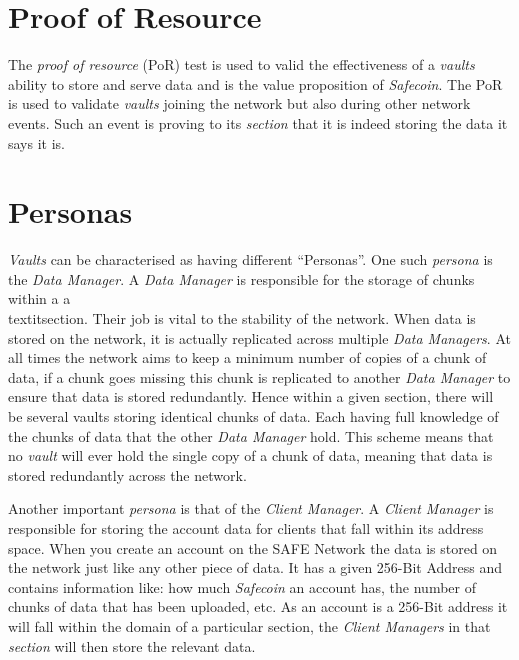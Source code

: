\section{Proof of Resource}
\label{subsec:proof-of-resource}

The \textit{proof of resource} (PoR) test is used to valid the effectiveness of a \textit{vaults} ability to store and serve data and is the value proposition of \textit{Safecoin}. The PoR is used to validate \textit{vaults} joining the network but also during other network events. Such an event is proving to its \textit{section} that it is indeed storing the data it says it is.

\section{Personas}

\textit{Vaults} can be characterised as having different ``Personas''. One such \textit{persona} is the \textit{Data Manager}. A \textit{Data Manager} is responsible for the storage of chunks within a a\\textit{section}. Their job is vital to the stability of the network. When data is stored on the network, it is actually replicated across multiple \textit{Data Managers}. At all times the network aims to keep a minimum number of copies of a chunk of data, if a chunk goes missing this chunk is replicated to another \textit{Data Manager} to ensure that data is stored redundantly. Hence within a given section, there will be several vaults storing identical chunks of data. Each having full knowledge of the chunks of data that the other \textit{Data Manager} hold. This scheme means that no \textit{vault} will ever hold the single copy of a chunk of data, meaning that data is stored redundantly across the network.

Another important \textit{persona} is that of the \textit{Client Manager}. A \textit{Client Manager} is responsible for storing the account data for clients that fall within its address space. When you create an account on the SAFE Network the data is stored on the network just like any other piece of data. It has a given 256-Bit Address and contains information like: how much \textit{Safecoin} an account has, the number of chunks of data that has been uploaded, etc. As an account is a 256-Bit address it will fall within the domain of a particular section, the \textit{Client Managers} in that \textit{section} will then store the relevant data.

